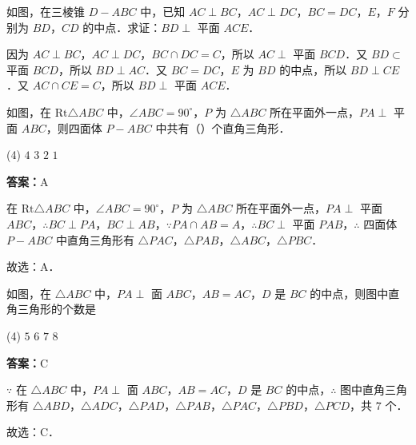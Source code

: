 \vspace{2em}

\begin{example}[\bkstar{3}{5}]
如图，在三棱锥 $D-ABC$ 中，已知 $AC\perp BC$，$AC\perp DC$，$BC=DC$，$E$，$F$ 分别为 $BD$，$CD$ 的中点．求证：$BD\perp$ 平面 $ACE$．
\end{example}
\begin{solution}
因为 $AC\perp BC$，$AC\perp DC$，$BC\cap DC=C$，所以 $AC\perp$ 平面 $BCD$．又 $BD\subset$ 平面 $BCD$，所以 $BD\perp AC$．又 $BC=DC$，$E$ 为 $BD$ 的中点，所以 $BD\perp CE$．又 $AC\cap CE=C$，所以 $BD\perp$ 平面 $ACE$．
\end{solution}

\vspace{2em}


\begin{example}[\bkstar{3}{5}]
如图，在 $\text{Rt}\triangle ABC$ 中，$\angle ABC=90^{\circ}$，$P$ 为 $\triangle ABC$ 所在平面外一点，$PA\perp$ 平面 $ABC$，则四面体 $P-ABC$ 中共有（\qquad）个直角三角形．
\begin{tasks}(4)
    \task $4$
    \task $3$
    \task $2$
    \task $1$
\end{tasks}
\end{example}
\begin{solution}
\textbf{答案：}A

在 $\text{Rt}\triangle ABC$ 中，$\angle ABC=90^{\circ}$，$P$ 为 $\triangle ABC$ 所在平面外一点，$PA\perp$ 平面 $ABC$，$\therefore BC\perp PA$，$BC\perp AB$，$\because PA\cap AB=A$，$\therefore BC\perp$ 平面 $PAB$，$\therefore$ 四面体 $P-ABC$ 中直角三角形有 $\triangle PAC$，$\triangle PAB$，$\triangle ABC$，$\triangle PBC$．

故选：A．
\end{solution}

\vspace{2em}

\begin{example}[\bkstar{3}{5}]
如图，在 $\triangle ABC$ 中，$PA\perp$ 面 $ABC$，$AB=AC$，$D$ 是 $BC$ 的中点，则图中直角三角形的个数是
\begin{tasks}(4)
    \task $5$
    \task $6$
    \task $7$
    \task $8$
\end{tasks}
\end{example}
\begin{solution}
\textbf{答案：}C

$\because$ 在 $\triangle ABC$ 中，$PA\perp$ 面 $ABC$，$AB=AC$，$D$ 是 $BC$ 的中点，$\therefore$ 图中直角三角形有 $\triangle ABD$，$\triangle ADC$，$\triangle PAD$，$\triangle PAB$，$\triangle PAC$，$\triangle PBD$，$\triangle PCD$，共 $7$ 个．

故选：C．
\end{solution}

